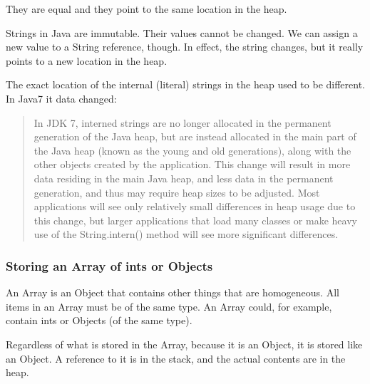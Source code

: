 They are equal and they point to the same location in the heap.

Strings in Java are immutable. Their values cannot be changed. We can assign a new value to a String reference, though. In effect, the string changes, but it really points to a new location in the heap.

The exact location of the internal (literal) strings in the heap used to be different. In Java7 it data changed\cite{java7}:

\begin{quotation}
In JDK 7, interned strings are no longer allocated in the permanent generation of the Java heap, but are instead allocated in the main part of the Java heap (known as the young and old generations), along with the other objects created by the application. This change will result in more data residing in the main Java heap, and less data in the permanent generation, and thus may require heap sizes to be adjusted. Most applications will see only relatively small differences in heap usage due to this change, but larger applications that load many classes or make heavy use of the String.intern() method will see more significant differences.
\end{quotation}


\subsubsection{Storing an Array of ints or Objects}
An Array is an Object that contains other things that are homogeneous. All items in an Array must be of the same type. An Array could, for example, contain ints or Objects (of the same type). 

Regardless of what is stored in the Array, because it is an Object, it is stored like an Object. A reference to it is in the stack, and the actual contents are in the heap.